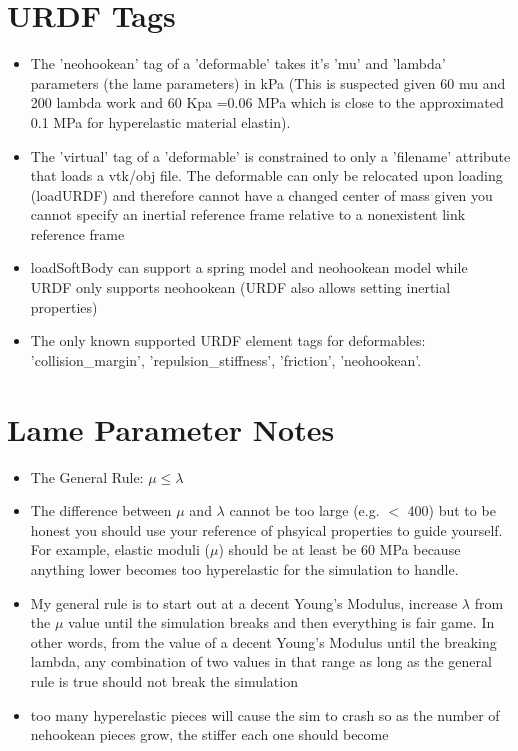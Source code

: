 \documentclass{article}
\begin{document}
\section{URDF Tags}
\begin{itemize}
    \item The 'neohookean' tag of a 'deformable' takes it's 'mu' and 'lambda' parameters (the lame parameters) in kPa (This is suspected given 60 mu and 200 lambda work and 60 Kpa =0.06 MPa which is close to the approximated 0.1 MPa for hyperelastic material elastin).
    \item The 'virtual' tag of a 'deformable' is constrained to only a 'filename' attribute that loads a vtk/obj file. The deformable can only be relocated upon loading (loadURDF) and therefore cannot have a changed center of mass given you cannot specify an inertial reference frame relative to a nonexistent link reference frame
    \item loadSoftBody can support a spring model and neohookean model while URDF only supports neohookean (URDF also allows setting inertial properties)
    \item The only known supported URDF element tags for deformables: 'collision\_margin', 'repulsion\_stiffness', 'friction', 'neohookean'.
\end{itemize}

\section{Lame Parameter Notes}
\begin{itemize}
    \item The General Rule: $\mu \leq \lambda$
    \item The difference between $\mu$ and $\lambda$ cannot be too large (e.g. $<$ 400) but to be honest you should use your reference of phsyical properties to guide yourself. For example,
    elastic moduli ($\mu$) should be at least be 60 MPa because anything lower becomes too hyperelastic for the simulation to handle.
    \item My general rule is to start out at a decent Young's Modulus, increase $\lambda$ from the $\mu$ value until the simulation breaks and then everything
    is fair game. In other words, from the value of a decent Young's Modulus until the breaking lambda, any combination of two values in that range as long as the general rule is true should not break the simulation
    \item too many hyperelastic pieces will cause the sim to crash so as the number of nehookean pieces grow, the stiffer each one should become
\end{itemize}
\end{document}
